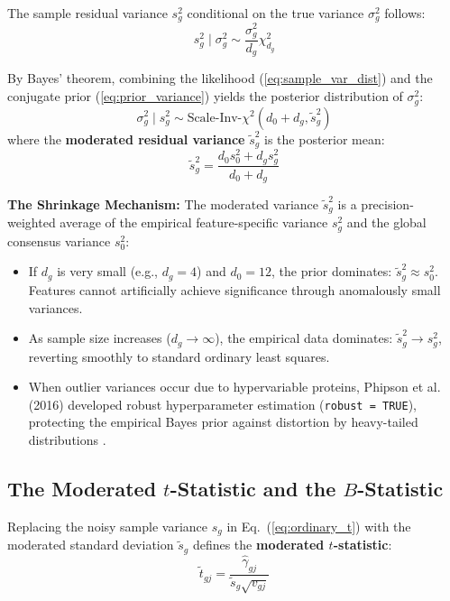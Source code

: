 \documentclass[11pt,twoside,openright]{book}
\begin{document}
The sample residual variance $s_g^2$ conditional on the true variance $\sigma_g^2$ follows:
\begin{equation}
s_g^2 \mid \sigma_g^2 \sim \frac{\sigma_g^2}{d_g} \chi^2_{d_g}
\label{eq:sample_var_dist}
\end{equation}

By Bayes' theorem, combining the likelihood (\ref{eq:sample_var_dist}) and the conjugate prior (\ref{eq:prior_variance}) yields the posterior distribution of $\sigma_g^2$:
\begin{equation}
\sigma_g^2 \mid s_g^2 \sim \text{Scale-Inv-}\chi^2(d_0 + d_g, \tilde{s}_g^2)
\label{eq:posterior_variance}
\end{equation}
where the \textbf{moderated residual variance} $\tilde{s}_g^2$ is the posterior mean:
\begin{equation}
\tilde{s}_g^2 = \frac{d_0 s_0^2 + d_g s_g^2}{d_0 + d_g}
\label{eq:moderated_variance_formula}
\end{equation}

\begin{svgraybox}
\textbf{The Shrinkage Mechanism:} The moderated variance $\tilde{s}_g^2$ is a precision-weighted average of the empirical feature-specific variance $s_g^2$ and the global consensus variance $s_0^2$:
\begin{itemize}
    \item If $d_g$ is very small (e.g., $d_g = 4$) and $d_0 = 12$, the prior dominates: $\tilde{s}_g^2 \approx s_0^2$. Features cannot artificially achieve significance through anomalously small variances.
    \item As sample size increases ($d_g \to \infty$), the empirical data dominates: $\tilde{s}_g^2 \to s_g^2$, reverting smoothly to standard ordinary least squares.
    \item When outlier variances occur due to hypervariable proteins, Phipson et al. (2016) developed robust hyperparameter estimation (\texttt{robust = TRUE}), protecting the empirical Bayes prior against distortion by heavy-tailed distributions \cite{phipson2016robust}.
\end{itemize}
\end{svgraybox}

\subsection{The Moderated \texorpdfstring{$t$}{t}-Statistic and the \texorpdfstring{$B$}{B}-Statistic}

Replacing the noisy sample variance $s_g$ in Eq.~(\ref{eq:ordinary_t}) with the moderated standard deviation $\tilde{s}_g$ defines the \textbf{moderated $t$-statistic}:
\begin{equation}
\tilde{t}_{gj} = \frac{\hat{\gamma}_{gj}}{\tilde{s}_g \sqrt{v_{gj}}}
\label{eq:moderated_t}
\end{equation}
\end{document}
